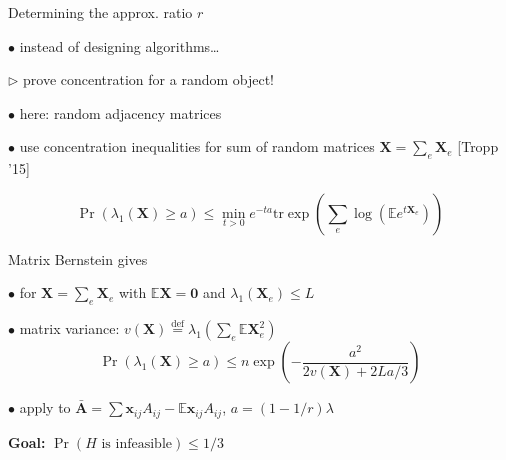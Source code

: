 \documentclass[14pt]{beamer}
\begin{document}
\begin{frame}{Determining the approx. ratio $r$}
\begin{fullpageitemize}
\item $\bullet$ instead of designing algorithms\ldots
\item $\triangleright$ prove concentration for a random object!
\item $\bullet$ here: random adjacency matrices
\item $\bullet$ use concentration inequalities for sum of random matrices $\mathbf{X} = \sum_e \mathbf{X}_{e}$ {\small[Tropp '15]}
\item \begin{equation*}
\Pr( \lambda_1(\mathbf{X}) \geq a) \leq \min_{t > 0} e^{-t a} \text{tr} \exp \left( \sum_e \log\left(\mathbb{E} e^{t \mathbf{X}_e}\right) \right)
\end{equation*}
\end{fullpageitemize}
\end{frame}

\begin{frame}{Matrix Bernstein gives}
\begin{fullpageitemize}
\item $\bullet$ for $\mathbf{X} = \sum_e \mathbf{X}_{e}$ with $\mathbb{E} \mathbf{X} = \mathbf{0}$ and $\lambda_1(\mathbf{X}_e) \leq L$
\item $\bullet$ matrix variance: $v(\mathbf{X}) \stackrel{\text{def}}{=}  \lambda_1(\sum_e \mathbb{E} \mathbf{X}_e^2)$
\begin{equation*}
    \Pr(\lambda_1(\mathbf{X}) \geq a) \leq
n \exp\left(-\dfrac{a^2}{2v(\mathbf{X}) + 2L a/3}\right)
\end{equation*}
\item $\bullet$ apply to $\bar{\mathbf{A}} = \sum \mathbf{x}_{ij} A_{ij} - \mathbb{E}\mathbf{x}_{ij} A_{ij}$, $a = (1 - 1/r) \lambda$
\item \textbf{Goal:} $\Pr(H \text{ is infeasible}) \leq 1/3$
\end{fullpageitemize}
\end{frame}
\end{document}
